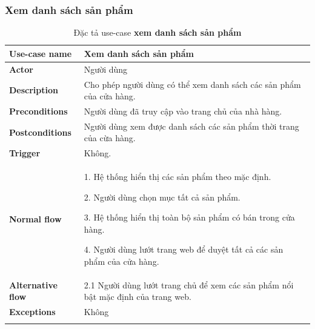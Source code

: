     \subsubsection{Xem danh sách sản phẩm} 
            \begin{center}
            
                \begin{longtable}{| p{} | p{} |} 
    \hline
    \textbf{Use-case name}
    & 
    Xem danh sách sản phẩm
    \\
    \hline
    \textbf{Actor} 
    & 
    Người dùng
    \\
    \hline
    \textbf{Description} 
    & 
    Cho phép người dùng có thể xem danh sách các sản phẩm của cửa hàng.
    \\
    \hline
     \textbf{Preconditions} 
    &
    Người dùng đã truy cập vào trang chủ của nhà hàng.
    \\
    \hline
    \textbf{Postconditions} 
    & 
    Người dùng xem được danh sách các sản phẩm thời trang của cừa hàng.
    \\
    \hline
    \textbf{Trigger} 
    & 
    Không.
    \\
    \hline
     \textbf{Normal flow}
    & 
        1. Hệ thống hiển thị các sản phẩm theo mặc định.
        
        2. Người dùng chọn mục tất cả sản phẩm.
        
        3. Hệ thống hiển thị toàn bộ sản phẩm có bán trong cửa hàng.
        
        4. Người dùng lướt trang web để duyệt tất cả các sản phẩm của cửa hàng.
    \\
    \hline
    \textbf{Alternative flow}
    & 
        2.1 Người dùng lướt trang chủ để xem các sản phẩm nổi bật mặc định của trang web.
    \\
    \hline
    \textbf{Exceptions} 
    &
    Không
    \\
    \hline
    \caption{Đặc tả use-case \textbf{xem danh sách sản phẩm}}
    \end{longtable}
                    
            \end{center}


